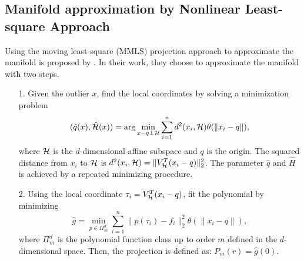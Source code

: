 \documentclass[aos,preprint]{imsart}
\theoremstyle{remark}
\begin{document}
\subsection{Manifold approximation by Nonlinear Least-square Approach}
Using the moving least-square (MMLS) projection approach to approximate the manifold is proposed by \cite{sober2019manifold}. In their work, they choose to approximate the manifold with two steps. 
\begin{itemize}
\item[1.] Given the outlier $x$, find the local coordinates by solving a minimization problem
\[
(\hat{q}(x),\hat{\cal H}(x))= \arg\min_{x-q\perp {\cal H}}  
 \sum_{i=1}^n d^2 (x_i, {\cal H}) \theta(\|x_i-q\|),
\]
where $\cal H$ is the $d$-dimensional affine subspace and $q$ is the origin. The squared distance from $x_i$ to $\cal H$ is $d^2 (x_i, {\cal H}) = \|V^T_{\cal H}(x_i -q)\|_2^2$.
The parameter $\hat{q}$ and $\hat{H}$ is achieved by a repeated minimizing procedure. 

\item[2.]  Using the local coordinate $\tau_i = V^T_{\cal H}(x_i-q)$, fit the polynomial by minimizing
\[
\hat{g} = \min_{p\in \Pi_m^d} \sum_{i=1}^n \|p(\tau_i)-f_i\|_2^2 \theta(\|x_i-q\|),
\]
where $\Pi_m^d$ is the polynomial function class up to order $m$ defined in the $d$-dimensional space. Then, the projection is defined as: $P_m(r) = \hat{g}(0)$. 
\end{itemize}
\end{document}
